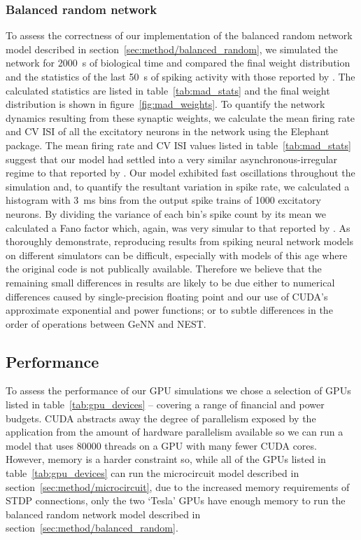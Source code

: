\documentclass[utf8]{frontiersSCNS} %
\begin{document}
\subsubsection{Balanced random network}
To assess the correctness of our implementation of the balanced random network model described in section~\ref{sec:method/balanced_random}, we simulated the network for \SI{2000}{\second} of biological time and compared the final weight distribution and the statistics of the last \SI{50}{\second} of spiking activity with those reported by \citet{Morrison2007}.
The calculated statistics are listed in table~\ref{tab:mad_stats} and the final weight distribution is shown in figure~\ref{fig:mad_weights}.
To quantify the network dynamics resulting from these synaptic weights, we calculate the mean firing rate and CV ISI of all the excitatory neurons in the network using the Elephant~\citep{Yegenoglu2018} package.
The mean firing rate and CV ISI values listed in table~\ref{tab:mad_stats} suggest that our model had settled into a very similar asynchronous-irregular regime to that reported by \citet{Morrison2007}.
Our model exhibited fast oscillations throughout the simulation and, to quantify the resultant variation in spike rate, we calculated a histogram with \SI{3}{\milli\second} bins from the output spike trains of \num{1000} excitatory neurons.
By dividing the variance of each bin's spike count by its mean we calculated a Fano factor which, again, was very simular to that reported by \citet{Morrison2007}.
As \citet{Pauli2018} thoroughly demonstrate, reproducing results from spiking neural network models on different simulators can be difficult, especially with models of this age where the original code is not publically available.
Therefore we believe that the remaining small differences in results are likely to be due either to numerical differences caused by single-precision floating point and our use of CUDA's approximate exponential and power functions; or to subtle differences in the order of operations between GeNN and NEST.

\subsection{Performance}
\label{sec:results/performance}
To assess the performance of our GPU simulations we chose a selection of GPUs listed in table~\ref{tab:gpu_devices} -- covering a range of financial and power budgets.
CUDA abstracts away the degree of parallelism exposed by the application from the amount of hardware parallelism available so we can run a model that uses \num{80000} threads on a GPU with many fewer CUDA cores.
However, memory is a harder constraint so, while all of the GPUs listed in table~\ref{tab:gpu_devices} can run the microcircuit model described in section~\ref{sec:method/microcircuit}, due to the increased memory requirements of STDP connections, only the two `Tesla' GPUs have enough memory to run the balanced random network model described in section~\ref{sec:method/balanced_random}.
\end{document}
